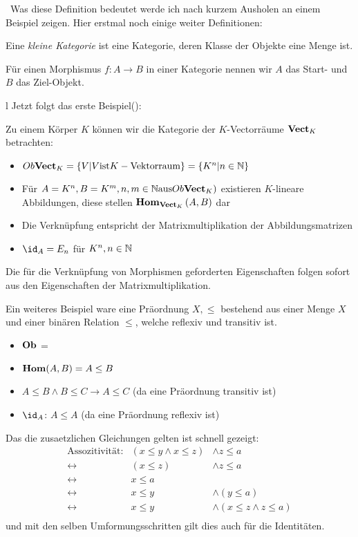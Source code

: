 \documentclass{article}
\begin{document}
		\
		Was  diese Definition bedeutet werde ich nach kurzem Ausholen an einem Beispiel zeigen.
		Hier erstmal noch einige weiter Definitionen:
		
		Eine \emph{kleine Kategorie} ist eine Kategorie, deren Klasse der Objekte eine Menge ist.

		F\"ur einen Morphismus \( f: A \to B \) in einer Kategorie \CatC nennen wir \( A \) das Start- und \( B \) das Ziel-Objekt.
		
		\label{test}
l		Jetzt folgt das erste Beispiel(\cite[Beispiel 2.2.10]{Bra}):
		
		Zu einem K\"orper \( K \) k\"onnen wir die Kategorie der \( K\)-Vectorr\"aume \( \mathbf{Vect}_K \) betrachten:
		\begin{itemize}
			\item	\( Ob \mathbf{Vect}_K = \left\lbrace V | V \text{ist} K-\text{Vektorraum} \right\rbrace  = \left\lbrace K^n | n \in \mathbb{N} \right\rbrace \)
			\item F\"ur  \( A=K^n , B =K^m , n,m \in \mathbb{N} \text{aus} Ob\mathbf{Vect}_K) \) existieren $K$-lineare Abbildungen, diese stellen \(  \mathbf{Hom } _{\mathbf{Vect}_K}\left( A,B \right) \) dar
			\item Die Verkn\"upfung entspricht der Matrixmultiplikation der Abbildungsmatrizen 
			\item \( \id_A = E_n \) f\"ur \( K^n , n \in \mathbb{N} \)
		 \end{itemize}
		 Die f\"ur die Verkn\"upfung von Morphismen geforderten Eigenschaften folgen sofort aus den Eigenschaften der Matrixmultiplikation.
		 
		 
		 Ein weiteres Beispiel ware eine Pr\"aordnung \( X, \leq \) bestehend aus einer Menge \( X \) und einer bin\"aren Relation \( \leq \), welche reflexiv und transitiv ist.
		 
		 \begin{itemize}
			 \item \( \mathbf{Ob}  \) = \BN
			 \item \(   \mathbf{Hom } (A,B) = A \leq B \)
			 \item \( A \leq B \wedge B \leq  C \rightarrow A \leq C \)  (da eine Pr\"aordnung transitiv ist) 
			 \item \( \id_A \): \( A \leq A \) (da eine  Pr\"aordnung reflexiv ist)
		 \end{itemize}
			 Das die zusaetzlichen Gleichungen gelten ist schnell gezeigt:
			 \begin{eqnarray}
			  \text{Assozitivit\"at:} &  ( x \leq y \wedge x \leq z ) & \wedge z \leq a \\
					 \leftrightarrow & (x \leq z ) & \wedge  z \leq a \\
					 \leftrightarrow & x \leq a & \\
					 \leftrightarrow & 	x \leq y  & \wedge  (y \leq a) \\
					 \leftrightarrow &   x \leq y & \wedge  (x \leq z  \wedge  z \leq a )\\
			 \end{eqnarray}
			 und mit den selben Umformungsschritten gilt dies auch f\"ur die Identit\"aten.
		 
\end{document}
